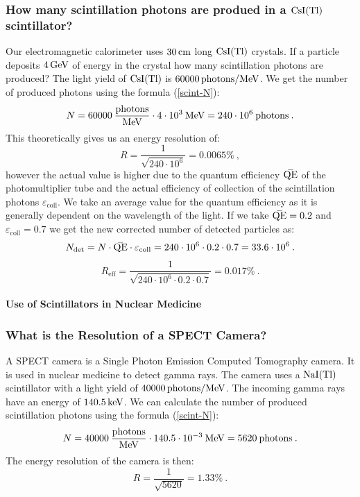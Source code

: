 \documentclass[10pt, titlepage, a4paper]{article}
\newcommand\thickbar[1]{\accentset{\rule{.5em}{.03em}}{#1}}
\renewcommand{\bar}{\thickbar}
\numberwithin{equation}{section}
\begin{document}
\subsubsection{How many scintillation photons are produed in a $\rm{CsI(Tl)}$ scintillator?}
Our electromagnetic calorimeter uses $30\,\rm{cm}$ long $\rm{CsI(Tl)}$ crystals. If a particle deposits $4\,\rm{GeV}$ of 
energy in the crystal how many scintillation photons are produced? The light yield of $\rm{CsI(Tl)}$ is $60000\,\rm{photons/MeV}$.
We get the number of produced photons using the formula (\ref{scint-N}):
%
\begin{equation}
    N = 60000\>\frac{\rm{photons}}{\rm{MeV}}\cdot 4\cdot10^3\>\rm{MeV} = 240\cdot10^6\>\rm{photons}\>.
\end{equation}
%
This theoretically gives us an energy resolution of:
%
\begin{equation}
    R = \frac{1}{\sqrt{240\cdot10^6}} = 0.0065\%\>,
\end{equation}
%
however the actual value is higher due to the quantum efficiency $\bar{\rm{QE}}$ of the photomultiplier tube and the actual efficiency of 
collection of the scintillation photons $\varepsilon_{\text{coll}}$. We take an average value for the quantum efficiency
as it is generally dependent on the wavelength of the light. If we take $\bar{\rm{QE}} = 0.2$ and $\varepsilon_{\text{coll}} = 0.7$ we get the 
new corrected number of detected particles as:
%
\begin{equation}
    N_{\text{det}} =N\cdot\bar{\rm{QE}}\cdot\varepsilon_\text{coll}=240\cdot10^6\cdot 0.2\cdot 0.7 = 33.6\cdot10^6\>.
\end{equation}
%
\begin{equation}
    R_{\text{eff}} = \frac{1}{\sqrt{240\cdot10^6\cdot 0.2\cdot 0.7}} = 0.017\%\>.
\end{equation}
%
\paragraph{Use of Scintillators in Nuclear Medicine}
\subsubsection{What is the Resolution of a SPECT Camera?}
A SPECT camera is a Single Photon Emission Computed Tomography camera. It is used in nuclear medicine to detect gamma rays. 
The camera uses a $\rm{NaI(Tl)}$ scintillator with a light yield of $40000\,\rm{photons/MeV}$. The incoming gamma rays have an energy of 
$140.5\,\rm{keV}$. We can calculate the number of produced scintillation photons using the formula (\ref{scint-N}):
%
\begin{equation}
    N = 40000\>\frac{\rm{photons}}{\rm{MeV}}\cdot 140.5\cdot10^{-3}\>\rm{MeV} = 5620\>\rm{photons}\>.
\end{equation}
%
The energy resolution of the camera is then:
%
\begin{equation}
    R = \frac{1}{\sqrt{5620}} = 1.33\%\>.
\end{equation}
\end{document}
